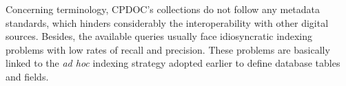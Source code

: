 Concerning terminology, CPDOC's collections do not follow any metadata
standards, which hinders considerably the interoperability with other
digital sources. Besides, the available queries usually face
idiosyncratic indexing problems with low rates of recall and
precision. These problems are basically linked to the \emph{ad hoc}
indexing strategy adopted earlier to define database tables and
fields.


%


